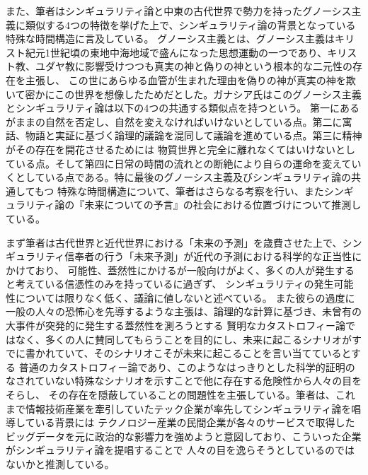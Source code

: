 \documentclass[uplatex]{jsarticle}
\begin{document}
また、筆者はシンギュラリティ論と中東の古代世界で勢力を持ったグノーシス主義に類似する4つの特徴を挙げた上で、シンギュラリティ論の背景となっている特殊な時間構造に言及している。
グノーシス主義とは、グノーシス主義はキリスト紀元1世紀頃の東地中海地域で盛んになった思想運動の一つであり、キリスト教、ユダヤ教に影響受けつつも真実の神と偽りの神という根本的な二元性の存在を主張し、
この世にあらゆる血管が生まれた理由を偽りの神が真実の神を欺いて密かにこの世界を想像したためだとした。ガナシア氏はこのグノーシス主義とシンギュラリティ論は以下の4つの共通する類似点を持つという。
第一にあるがままの自然を否定し、自然を変えなければいけないとしている点。第二に寓話、物語と実証に基づく論理的議論を混同して議論を進めている点。第三に精神がその存在を開花させるためには
物質世界と完全に離れなくてはいけないとしている点。そして第四に日常の時間の流れとの断絶により自らの運命を変えていくとしている点である。特に最後のグノーシス主義及びシンギュラリティ論の共通してもつ
特殊な時間構造について、筆者はさらなる考察を行い、またシンギュラリティ論の『未来についての予言』の社会における位置づけについて推測している。

まず筆者は古代世界と近代世界における「未来の予測」を歳費させた上で、シンギュラリティ信奉者の行う「未来予測」が近代の予測における科学的な正当性にかけており、
可能性、蓋然性にかけるが一般向けがよく、多くの人が発生すると考えている信憑性のみを持っているに過ぎず、
シンギュラリティの発生可能性については限りなく低く、議論に値しないと述べている。
また彼らの過度に一般の人々の恐怖心を先導するような主張は、論理的な計算に基づき、未曾有の大事件が突発的に発生する蓋然性を測ろうとする
賢明なカタストロフィー論ではなく、多くの人に賛同してもらうことを目的にし、未来に起こるシナリオがすでに書かれていて、そのシナリオこそが未来に起こることを言い当てているとする
普通のカタストロフィー論であり、このようなはっきりとした科学的証明のなされていない特殊なシナリオを示すことで他に存在する危険性から人々の目をそらし、
その存在を隠蔽していることの問題性を主張している。筆者は、これまで情報技術産業を牽引していたテック企業が率先してシンギュラリティ論を唱導している背景には
テクノロジー産業の民間企業が各々のサービスで取得したビッグデータを元に政治的な影響力を強めようと意図しており、こういった企業がシンギュラリティ論を提唱することで
人々の目を逸らそうとしているのではないかと推測している。
\end{document}

